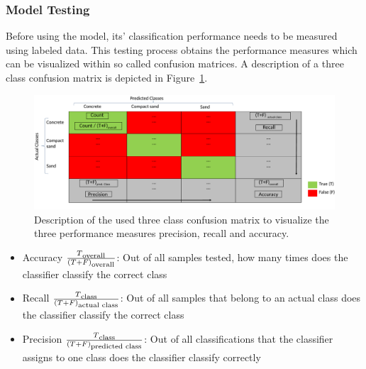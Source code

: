 \documentclass{article}
\begin{document}
\subsubsection{Model Testing}
Before using the model, its' classification performance needs to be measured using labeled data. This testing process obtains the performance measures which can be visualized within so called confusion matrices. A description of a three class confusion matrix is depicted in Figure~\ref{fig:CMdescrpit}.\cite{kuhr2021}

\begin{figure}[h]
\centering
\includegraphics[width=\textwidth]{../figures/CM_Description.pdf}
\caption{\label{fig:CMdescrpit}Description of the used three class confusion matrix to visualize the three performance measures precision, recall and accuracy.\cite{kuhr2021}}
\end{figure}
\begin{itemize}
\item Accuracy $\frac{T\textsubscript{overall}}{(T+F)\textsubscript{overall}}$: Out of all samples tested, how many times does the classifier classify the correct class
\item Recall $\frac{T\textsubscript{class}}{(T+F)\textsubscript{actual class}}$: Out of all samples that belong to an actual class does the classifier classify the correct class 
\item Precision $\frac{T\textsubscript{class}}{(T+F)\textsubscript{predicted class}}$: Out of all classifications that the classifier assigns to one class does the classifier classify correctly
\end{itemize}
\end{document}
